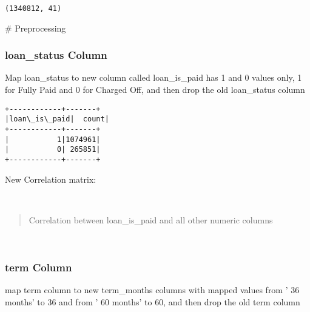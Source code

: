 \documentclass[11pt]{article}
\begin{document}
    \begin{Verbatim}[commandchars=\\\{\}]
(1340812, 41)
    \end{Verbatim}

    \# Preprocessing

    \hypertarget{loan_status-column}{%
\subsubsection{loan\_status Column}\label{loan_status-column}}

    Map loan\_status to new column called loan\_is\_paid has 1 and 0 values
only, 1 for Fully Paid and 0 for Charged Off, and then drop the old
loan\_status column

    \begin{Verbatim}[commandchars=\\\{\}]
+------------+-------+
|loan\_is\_paid|  count|
+------------+-------+
|           1|1074961|
|           0| 265851|
+------------+-------+

    \end{Verbatim}

    New Correlation matrix:

    \begin{center}
    \end{center}
    { \hspace*{\fill} \\}
    
    \begin{quote}
Correlation between loan\_is\_paid and all other numeric columns
\end{quote}

    \begin{center}
    \end{center}
    { \hspace*{\fill} \\}
    
    \hypertarget{term-column}{%
\subsubsection{term Column}\label{term-column}}

    map term column to new term\_months columns with mapped values from ' 36
months' to 36 and from ' 60 months' to 60, and then drop the old term
column
\end{document}
